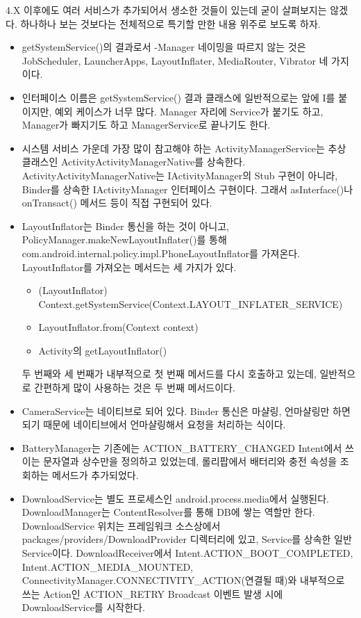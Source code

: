 4.X 이후에도 여러 서비스가 추가되어서 생소한 것들이 있는데 굳이 살펴보지는 않겠다.
하나하나 보는 것보다는 전체적으로 특기할 만한 내용 위주로 보도록 하자.
\begin{itemize}
\item getSystemService()의 결과로서 -Manager 네이밍을 따르지 않는 것은 JobScheduler, LauncherApps, LayoutInflater, MediaRouter, Vibrator 네 가지이다. 
\item 인터페이스 이름은 getSystemService() 결과 클래스에 일반적으로는 앞에 I를 붙이지만, 예외 케이스가 너무 많다. Manager 자리에 Service가 붙기도 하고, Manager가 빠지기도 하고 ManagerService로 끝나기도 한다. 
\item 시스템 서비스 가운데 가장 많이 참고해야 하는 ActivityManagerService는 추상 클래스인 ActivityActivityManagerNative를 상속한다. ActivityActivityManagerNative는 IActivityManager의 Stub 구현이 아니라, Binder를 상속한 IActivityManager 인터페이스 구현이다. 그래서 asInterface()나 onTransact() 메서드 등이 직접 구현되어 있다.
\item LayoutInflator는 Binder 통신을 하는 것이 아니고, PolicyManager.makeNewLayoutInflater()를 통해  com.android.internal.policy.impl.PhoneLayoutInflator를 가져온다.
LayoutInflator를 가져오는 메서드는 세 가지가 있다.
\begin{itemize}
\item (LayoutInflator) Context.getSystemService(Context.LAYOUT\_INFLATER\_SERVICE)
\item LayoutInflator.from(Context context)
\item Activity의 getLayoutInflator()
\end{itemize}
두 번째와 세 번째가 내부적으로 첫 번째 메서드를 다시 호출하고 있는데, 일반적으로 간편하게 많이 사용하는 것은 두 번째 메서드이다.
\item CameraService는 네이티브로 되어 있다. Binder 통신은 마샬링, 언마샬링만 하면 되기 때문에 네이티브에서 언마샬링해서 요청을 처리하는 식이다.
\item BatteryManager는 기존에는 ACTION\_BATTERY\_CHANGED Intent에서 쓰이는 문자열과 상수만을 정의하고 있었는데, 롤리팝에서 배터리와 충전 속성을 조회하는 메서드가 추가되었다.
\item DownloadService는 별도 프로세스인 android.process.media에서 실행된다. DownloadManager는 ContentResolver를 통해 DB에 쌓는 역할만 한다.
DownloadService 위치는 프레임워크 소스상에서 packages/providers/DownloadProvider 디렉터리에 있고, Service를 상속한 일반 Service이다. 
DownloadReceiver에서 Intent.ACTION\_BOOT\_COMPLETED, Intent.ACTION\_MEDIA\_MOUNTED, ConnectivityManager.CONNECTIVITY\_ACTION(연결될 때)와 내부적으로 쓰는 Action인 ACTION\_RETRY Broadcast 이벤트 발생 시에 DownloadService를 시작한다.

\end{itemize}
